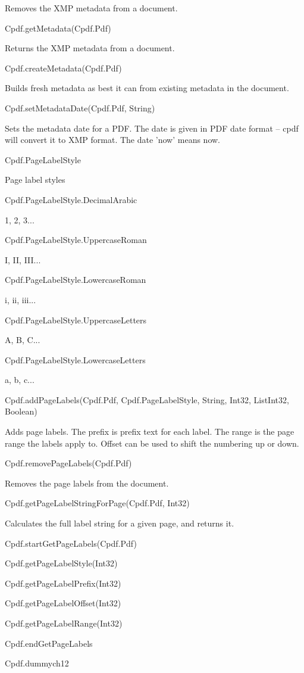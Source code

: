 Removes the XMP metadata from a document.


Cpdf.getMetadata(Cpdf.Pdf)


Returns the XMP metadata from a document.


Cpdf.createMetadata(Cpdf.Pdf)


Builds fresh metadata as best it can from
existing metadata in the document.


Cpdf.setMetadataDate(Cpdf.Pdf, String)


Sets the metadata date for a PDF. The date
is given in PDF date format -- cpdf will convert it to XMP format. The
date 'now' means now.


Cpdf.PageLabelStyle

Page label styles

Cpdf.PageLabelStyle.DecimalArabic

1, 2, 3...

Cpdf.PageLabelStyle.UppercaseRoman

I, II, III...

Cpdf.PageLabelStyle.LowercaseRoman

i, ii, iii...

Cpdf.PageLabelStyle.UppercaseLetters

A, B, C...

Cpdf.PageLabelStyle.LowercaseLetters

a, b, c...

Cpdf.addPageLabels(Cpdf.Pdf, Cpdf.PageLabelStyle, String, Int32, List{Int32}, Boolean)


Adds page labels. The prefix is prefix text for each label. The range is the page range the
labels apply to. Offset can be used to shift the numbering up or down.


Cpdf.removePageLabels(Cpdf.Pdf)


Removes the page labels from the document.


Cpdf.getPageLabelStringForPage(Cpdf.Pdf, Int32)


Calculates the full label
string for a given page, and returns it.


Cpdf.startGetPageLabels(Cpdf.Pdf)



Cpdf.getPageLabelStyle(Int32)



Cpdf.getPageLabelPrefix(Int32)



Cpdf.getPageLabelOffset(Int32)



Cpdf.getPageLabelRange(Int32)



Cpdf.endGetPageLabels



Cpdf.dummych12

